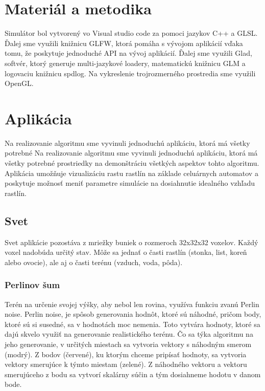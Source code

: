 \documentclass[12pt]{article}
\begin{document}
\section{Materiál a metodika}

Simulátor %
bol vytvorený vo Visual studio code za pomoci jazykov C++ a GLSL.
Ďalej sme využili knižnicu GLFW, ktorá pomáha s vývojom aplikácií vďaka tomu,
že poskytuje jednoduché API na vývoj aplikácií. Ďalej sme využili Glad,
softvér, ktorý generuje multi-jazykové loadery, matematickú knižnicu GLM
a logovaciu knižnicu spdlog. Na vykreslenie trojrozmerného prostredia sme
využili OpenGL.

\section{Aplikácia}

Na realizovanie algoritmu sme vyvinuli jednoduchú aplikáciu, ktorá má všetky
potrebné Na realizovanie algoritmu sme vyvinuli jednoduchú aplikáciu, ktorá má
všetky potrebné prostriedky na demonštráciu všetkých aspektov tohto algoritmu.
Aplikácia umožňuje vizualizáciu rastu rastlín na základe celuárnych automatov
a poskytuje možnosť meniť parametre simulácie na dosiahnutie idealného vzhľadu
rastlín.

\subsection{Svet}

Svet aplikácie pozostáva z mriežky buniek o rozmeroch 32x32x32 voxelov.
Každý voxel nadobúda určitý stav. Môže sa jednať o časti rastlín (stonka, list,
koreň alebo ovocie), ale aj o časti terénu (vzduch, voda, pôda).

\subsubsection{Perlinov šum}

Terén na určenie svojej výšky, aby nebol len rovina, využíva funkciu zvanú
Perlin noise. Perlin noise, je spôsob generovania hodnôt, ktoré sú náhodné,
pričom body, ktoré sú si susedné, sa v hodnotách moc nemenia. Toto vytvára
hodnoty, ktoré sa dajú skvelo využiť na generovanie realistického terénu.
Čo sa týka algoritmu na jeho generovanie, v určitých miestach sa vytvoria
vektory s náhodným smerom (modrý). Z bodov (červené), ku ktorým chceme pripísať
hodnoty, sa vytvoria vektory smerujúce k týmto miestam (zelené). Z náhodného
vektoru a vektoru smerujúceho z bodu sa vytvorí skalárny súčin a tým dosiahneme
hodotu v danom bode.
\end{document}
